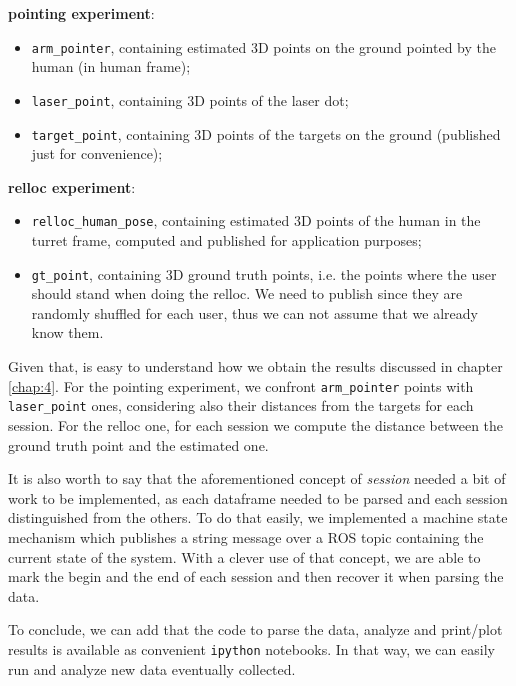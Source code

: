 \textbf{pointing experiment}:
\begin{itemize}
    \item \texttt{arm\_pointer}, containing estimated 3D points on the ground pointed by the human (in human frame);
    \item \texttt{laser\_point}, containing 3D points of the laser dot;
    \item \texttt{target\_point}, containing 3D points of the targets on the ground (published just for convenience);
\end{itemize}
\textbf{relloc experiment}:
\begin{itemize}
    \item \texttt{relloc\_human\_pose}, containing estimated 3D points of the human in the turret frame, computed and published for application purposes;
    \item \texttt{gt\_point}, containing 3D ground truth points, i.e. the points where the user should stand when doing the relloc. We need to publish since they are randomly shuffled for each user, thus we can not assume that we already know them.
\end{itemize}
Given that, is easy to understand how we obtain the results discussed in chapter \ref{chap:4}. For the pointing experiment, we confront \texttt{arm\_pointer} points with \texttt{laser\_point} ones, considering also their distances from the targets for each session. For the relloc one, for each session we compute the distance between the ground truth point and the estimated one.

It is also worth to say that the aforementioned concept of \textit{session} needed a bit of work to be implemented, as each dataframe needed to be parsed and each session distinguished from the others. To do that easily, we implemented a machine state mechanism which publishes a string message over a ROS topic containing the current state of the system. With a clever use of that concept, we are able to mark the begin and the end of each session and then recover it when parsing the data.

To conclude, we can add that the code to parse the data, analyze and print/plot results is available as convenient \texttt{ipython} notebooks. In that way, we can easily run and analyze new data eventually collected.